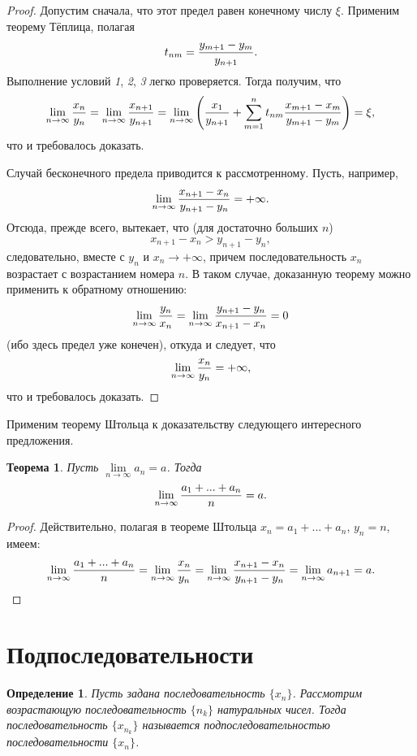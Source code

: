 \documentclass{article}
\newtheorem{theorem}{Теорема}[section]
\newtheorem{definition}{Определение}[section]
\begin{document}
\begin{proof}
Допустим сначала, что этот предел равен конечному числу \(\xi\). Применим теорему Тёплица, полагая
\[
t_{nm} = {{y_{m + 1} - y_{m}}\over y_{n + 1}}.
\]
Выполнение условий \textit{1}, \textit{2}, \textit{3} легко проверяется. Тогда получим, что
\[
\lim\limits_{n \to \infty}{x_n \over y_n} = \lim\limits_{n \to \infty}{x_{n + 1} \over y_{n + 1}} = \lim\limits_{n \to \infty}\left({x_1 \over y_{n + 1}} + \sum\limits_{m = 1}^n {t_{nm} {{x_{m + 1} - x_{m}} \over {y_{m + 1} - y_{m}}}}\right) = \xi,
\]
что и требовалось доказать.

Случай бесконечного предела приводится к рассмотренному. Пусть, например,
\[
\lim\limits_{n \to \infty}{{x_{n + 1} - x_{n}} \over {y_{n + 1} - y_{n}}} = + \infty.
\]
Отсюда, прежде всего, вытекает, что (для достаточно больших \(n\))
\[
x_{n + 1} - x_{n} > y_{n + 1} - y_{n},
\]
следовательно, вместе с \(y_n\) и \(x_n \to + \infty\), причем последовательность \(x_n\) возрастает с возрастанием номера \(n\). В таком случае, доказанную теорему можно применить к обратному отношению:
\[
\lim\limits_{n \to \infty}{{y_n} \over {x_n}} = \lim\limits_{n \to \infty}{{y_{n + 1} - y_{n}} \over {x_{n + 1} - x_{n}}} = 0
\]
(ибо здесь предел уже конечен), откуда и следует, что
\[
\lim\limits_{n \to \infty}{{x_n} \over {y_n}} = + \infty,
\]
что и требовалось доказать.
\end{proof}

Применим теорему Штольца к доказательству следующего интересного предложения.

\begin{theorem}
Пусть \(\lim\limits_{n \to \infty}{a_n} = a\). Тогда
\[
\lim\limits_{n \to \infty}{{a_1 + ... + a_n} \over n} = a.
\]
\end{theorem}

\begin{proof}
Действительно, полагая в теореме Штольца \(x_n = a_1 + ... + a_n\), \(y_n = n\), имеем:
\[
\lim\limits_{n \to \infty}{{a_1 + ... + a_n} \over n} = \lim\limits_{n \to \infty}{x_n \over y_n} = \lim\limits_{n \to \infty}{{x_{n + 1} - x_{n}} \over {y_{n + 1} - y_{n}}} = \lim\limits_{n \to \infty}{a_{n + 1}} = a.
\]
\end{proof}

\section{Подпоследовательности}

\begin{definition}
Пусть задана последовательность \(\{x_n\}\). Рассмотрим возрастающую последовательность \(\{n_k\}\) натуральных чисел. Тогда последовательность \(\{x_{n_k}\}\) называется подпоследовательностью последовательности \(\{x_n\}\).
\end{definition}
\end{document}
